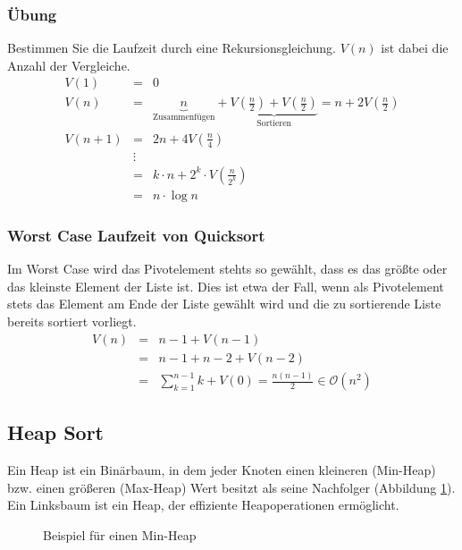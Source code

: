 \subsubsection{Übung}
Bestimmen Sie die Laufzeit durch eine Rekursionsgleichung.
\(V(n)\) ist dabei die Anzahl der Vergleiche.
\begin{eqnarray*}
	V(1) &=& 0 \\
	V(n) &=& \underbrace{n}_{\textrm{Zusammenfügen}} + \underbrace{V(\frac{n}{2}) + V(\frac{n}{2})}_{\textrm{Sortieren}} = n + 2V(\frac{n}{2}) \\
	V(n+1) &=& 2n + 4V(\frac{n}{4}) \\
		&\vdots&	\\
		&=& k \cdot n + 2^{k} \cdot V(\frac{n}{2^{k}})	\\
		&=&n \cdot \log n
\end{eqnarray*}

\subsubsection{Worst Case Laufzeit von Quicksort}
Im Worst Case wird das Pivotelement stehts so gewählt, dass es das größte oder das kleinste Element der Liste ist.
Dies ist etwa der Fall, wenn als Pivotelement stets das Element am Ende der Liste gewählt wird und die zu sortierende Liste bereits sortiert vorliegt.
\begin{eqnarray*}
	V(n) &=& n-1 + V(n-1)	\\
		 &=& n-1 + n-2 + V(n-2)	\\
		 &=& \sum \limits_{k=1}^{n-1} k + V(0) = \frac{n(n-1)}{2} \in \mathcal{O}(n^{2})
\end{eqnarray*}

\subsection{Heap Sort}
Ein Heap ist ein Binärbaum, in dem jeder Knoten einen kleineren (Min-Heap) bzw. einen größeren (Max-Heap) Wert besitzt als seine Nachfolger (Abbildung \ref{fig:MinHeap}).
Ein Linksbaum ist ein Heap, der effiziente Heapoperationen ermöglicht.
\begin{figure}[htbp]
	\begin{center}
	\end{center}
	\caption{Beispiel für einen Min-Heap}
	\label{fig:MinHeap}
\end{figure}

